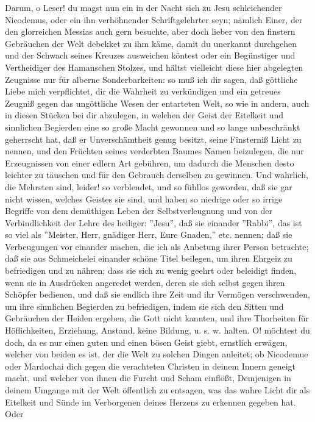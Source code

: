 Darum, o Leser! du magst nun ein in der Nacht sich zu Jesu schleichender
Nicodemus, oder ein ihn verhöhnender Schriftgelehrter seyn; nämlich Einer, der
den glorreichen Messias auch gern besuchte, aber doch lieber von den finstern
Gebräuchen der Welt debekket zu ihm käme, damit du unerkannt durchgehen und der
Schwach seines Kreuzes ausweichen köntest oder ein Begünstiger und Vertheidiger
des Hamanschen Stolzes, und hältst vielleicht diese hier abgelegten Zeugnisse
nur für alberne Sonderbarkeiten: so muß ich dir sagen, daß göttliche Liebe mich
verpflichtet, dir die Wahrheit zu verkündigen und ein getreues Zeugniß gegen das
ungöttliche Wesen der entarteten Welt, so wie in andern, auch in diesen Stücken
bei dir abzulegen, in welchen der Geist der Eitelkeit und sinnlichen Begierden
eine so große Macht gewonnen und so lange unbeschränkt geherrscht hat, daß er
Unverschämtheit genug besitzt, seine Finsterniß Licht zu nennen, und den
Früchten seines verderbten Baumes Namen beizulegen, die nur Erzeugnissen von
einer edlern Art gebühren, um dadurch die Menschen desto leichter zu täuschen
und für den Gebrauch derselben zu gewinnen. Und wahrlich, die Mehrsten sind,
leider! so verblendet, und so fühllos geworden, daß sie gar nicht wissen,
welches Geistes sie sind, und haben so niedrige oder so irrige Begriffe von dem
demüthigen Leben der Selbstverleugnung und von der Verbindlichkeit der Lehre des
heiliger: ''Jesu'', daß sie einander ''Rabbi'', das ist so viel als ''Meister,
Herr, gnädiger Herr, Eure Gnaden,'' etc. nennen; daß sie Verbeugungen vor
einander machen, die ich als Anbetung ihrer Person betrachte; daß sie aus
Schmeichelei einander schöne Titel beilegen, um ihren Ehrgeiz zu befriedigen und
zu nähren; dass sie sich zu wenig geehrt oder beleidigt finden, wenn sie in
Ausdrücken angeredet werden, deren sie sich selbst gegen ihren Schöpfer
bedienen, und daß sie endlich ihre Zeit und ihr Vermögen verschwenden, um ihre
sinnlichen Begierden zu befriedigen, indem sie sich den Sitten und Gebräuchen
der Heiden ergeben, die Gott nicht kannten, und ihre Thorheiten für
Höflichkeiten, Erziehung, Anstand, keine Bildung, u. s. w. halten. O! möchtest
du doch, da es nur einen guten und einen bösen Geist giebt, ernstlich erwägen,
welcher von beiden es ist, der die Welt zu solchen Dingen anleitet; ob Nicodemue
oder Mardochai dich gegen die verachteten Christen in deinem Innern geneigt
macht, und welcher von ihnen die Furcht und Scham einflößt, Demjenigen in deinem
Umgange mit der Welt öffentlich zu entsagen, was das wahre Licht dir als
Eitelkeit und Sünde im Verborgenen deines Herzens zu erkennen gegeben hat. Oder
